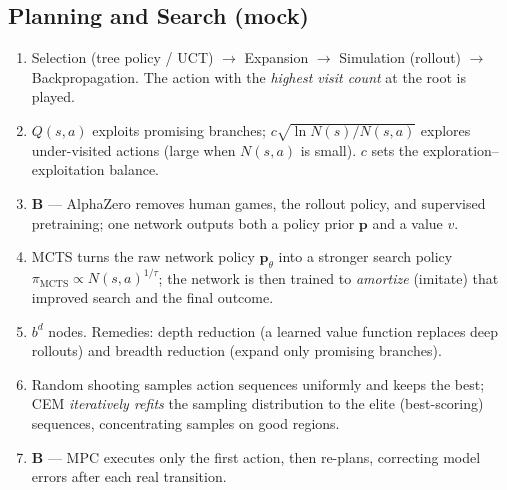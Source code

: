 \documentclass[11pt,oneside]{article}
\begin{document}
\subsection*{Planning and Search (mock)}
\begin{enumerate}[label=\textbf{Q\arabic*.}, leftmargin=3em, itemsep=3pt, start=41]
  \item Selection (tree policy / UCT) $\to$ Expansion $\to$ Simulation (rollout) $\to$ Backpropagation. The action with the \emph{highest visit count} at the root is played.
  \item $Q(s,a)$ exploits promising branches; $c\sqrt{\ln N(s)/N(s,a)}$ explores under-visited actions (large when $N(s,a)$ is small). $c$ sets the exploration--exploitation balance.
  \item \textbf{B} --- AlphaZero removes human games, the rollout policy, and supervised pretraining; one network outputs both a policy prior $\mathbf{p}$ and a value $v$.
  \item MCTS turns the raw network policy $\mathbf{p}_\theta$ into a stronger search policy $\pi_{\text{MCTS}}\propto N(s,a)^{1/\tau}$; the network is then trained to \emph{amortize} (imitate) that improved search and the final outcome.
  \item $b^d$ nodes. Remedies: depth reduction (a learned value function replaces deep rollouts) and breadth reduction (expand only promising branches).
  \item Random shooting samples action sequences uniformly and keeps the best; CEM \emph{iteratively refits} the sampling distribution to the elite (best-scoring) sequences, concentrating samples on good regions.
  \item \textbf{B} --- MPC executes only the first action, then re-plans, correcting model errors after each real transition.
\end{enumerate}
\end{document}
